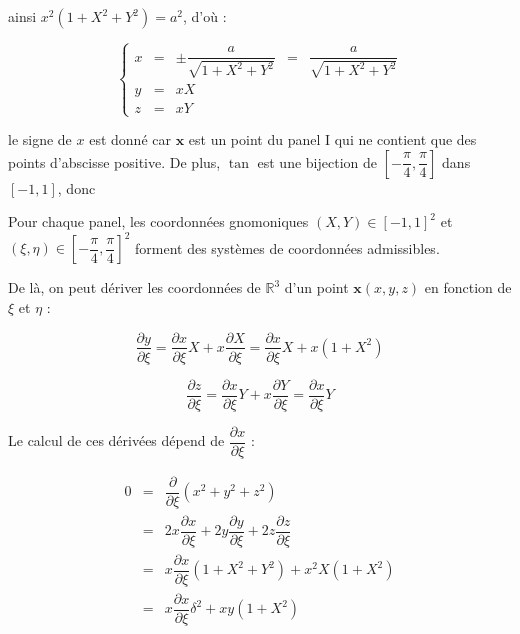 ainsi $x^2 \left( 1+X^2+Y^2 \right) = a^2$, d'où :

\begin{equation}
\left\lbrace
\begin{array}{rclcl}
x & = & \pm \dfrac{a}{\sqrt{1+X^2+Y^2}}& = & \dfrac{a}{\sqrt{1+X^2+Y^2}}\\
y & = & xX &&\\
z & = & xY &&
\end{array}
\right.
\end{equation}

le signe de $x$ est donné car $\mathbf{x}$ est un point du panel I qui ne contient que des points d'abscisse positive.
De plus, $\tan$ est une bijection de $\left[ -\dfrac{\pi}{4}, \dfrac{\pi}{4} \right]$ dans $\left[-1,1\right]$, donc

\begin{theoreme}
Pour chaque panel, les coordonnées gnomoniques $(X,Y) \in [-1,1]^2$ et $(\xi, \eta) \in \left[ - \dfrac{\pi}{4}, \dfrac{\pi}{4} \right]^2$ forment des systèmes de coordonnées admissibles.
\end{theoreme}

De là, on peut dériver les coordonnées de $\mathbb{R}^3$ d'un point $\mathbf{x}(x,y,z)$ en fonction de $\xi$ et $\eta$ :

\begin{equation}
\dfrac{\partial y}{\partial \xi} = \dfrac{\partial x}{\partial \xi} X + x \dfrac{\partial X}{\partial \xi} = \dfrac{\partial x}{\partial \xi} X + x(1+X^2)
\end{equation}

\begin{equation}
\dfrac{\partial z}{\partial \xi} = \dfrac{\partial x}{\partial \xi} Y + x \dfrac{\partial Y}{\partial \xi} = \dfrac{\partial x}{\partial \xi} Y
\end{equation}

Le calcul de ces dérivées dépend de $\dfrac{\partial x}{\partial \xi}$ :

\begin{equation*}
\begin{array}{rcl}
0 & = & \dfrac{\partial}{\partial \xi} ( x^2+y^2+z^2) \\
  & = & 2x\dfrac{\partial x}{\partial \xi} + 2y\dfrac{\partial y}{\partial \xi}+ 2z\dfrac{\partial z}{\partial \xi} \\
  & = & x \dfrac{\partial x}{\partial \xi} ( 1 +X^2 + Y^2) + x^2 X (1+X^2)\\
  & = & x \dfrac{\partial x}{\partial \xi} \delta^2 + xy (1+X^2)
\end{array}
\end{equation*}

